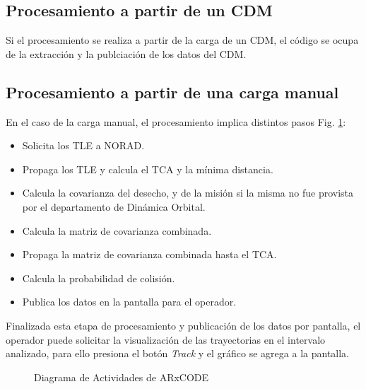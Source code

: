 \subsection*{Procesamiento a partir de un CDM}
Si el procesamiento se realiza a partir de la carga de un CDM, el c\'odigo se ocupa de la extracci\'on y la publciaci\'on de los datos del CDM. 
\subsection*{Procesamiento a partir de una carga manual}
En el caso de la carga manual, el procesamiento implica distintos pasos Fig. \ref{fig:actdiag}:
\begin{itemize}
 \item Solicita los TLE a NORAD.
 \item Propaga los TLE y calcula el TCA y la m\'inima distancia.
 \item Calcula la covarianza del desecho, y de la misi\'on si la misma no fue provista por el departamento de Din\'amica Orbital.
 \item Calcula la matriz de covarianza combinada.
 \item Propaga la matriz de covarianza combinada hasta el TCA.
 \item Calcula la probabilidad de colisi\'on.
 \item Publica los datos en la pantalla para el operador.
\end{itemize}

Finalizada esta etapa de procesamiento y publicaci\'on de los datos por pantalla, el operador puede solicitar la visualizaci\'on de las trayectorias en el intervalo analizado, para ello presiona el bot\'on {\it{Track}} y el gr\'afico se agrega a la pantalla.\\

\begin{figure}[h!]
  \centering
  \caption{Diagrama de Actividades de ARxCODE}
  \label{fig:actdiag}
\end{figure}

